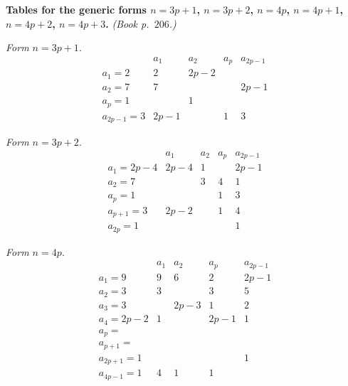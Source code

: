\documentclass[11pt]{article}
\begin{document}
\medskip


\noindent\textbf{Tables for the generic forms $n=3p+1$, $n=3p+2$,
$n=4p$, $n=4p+1$, $n=4p+2$, $n=4p+3$.} \emph{(Book p.~$206$.)}

\medskip

\noindent\textit{Form $n=3p+1$.}
\[
\begin{array}{l|cccc}
              & a_{1} & a_{2} & a_{p} & a_{2p-1}\\
\hline
a_{1}=2       & 2     & 2p-2  &       & \\
a_{2}=7       & 7     &       &       & 2p-1\\
a_{p}=1       &       & 1     &       & \\
a_{2p-1}=3    & 2p-1  &       & 1     & 3
\end{array}
\]

\noindent\textit{Form $n=3p+2$.}
\[
\begin{array}{l|cccc}
              & a_{1} & a_{2} & a_{p}  & a_{2p-1}\\
\hline
a_{1}=2p-4    & 2p-4  & 1     &        & 2p-1\\
a_{2}=7       &       & 3     & 4      & 1\\
a_{p}=1       &       &       & 1      & 3\\
a_{p+1}=3     & 2p-2  &       & 1      & 4\\
a_{2p}=1      &       &       &        & 1
\end{array}
\]

\noindent\textit{Form $n=4p$.}
\[
\begin{array}{l|cccc}
              & a_{1} & a_{2} & a_{p}   & a_{2p-1}\\
\hline
a_{1}=9       & 9     & 6     & 2       & 2p-1\\
a_{2}=3       & 3     &       & 3       & 5\\
a_{3}=3       &       & 2p-3  & 1       & 2\\
a_{4}=2p-2    & 1     &       & 2p-1    & 1\\
a_{p}=        &       &       &         & \\
a_{p+1}=      &       &       &         & \\
a_{2p+1}=1    &       &       &         & 1\\
a_{4p-1}=1    & 4     & 1     & 1       &
\end{array}
\]
\end{document}
